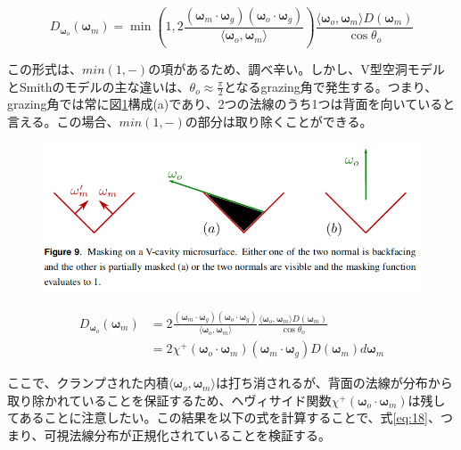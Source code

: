 \documentclass[a4j,xelatex,ja=standard]{bxjsarticle}
\begin{document}
\begin{equation}
    D_{\boldsymbol{\omega}_o}(\boldsymbol{\omega}_m) = \min \left( 1, 2 \frac{(\boldsymbol{\omega}_m \cdot \boldsymbol{\omega}_g) (\boldsymbol{\omega}_o \cdot \boldsymbol{\omega}_g)}{\langle \boldsymbol{\omega}_o, \boldsymbol{\omega}_m \rangle} \right) \frac{\langle \boldsymbol{\omega}_o, \boldsymbol{\omega}_m \rangle D(\boldsymbol{\omega}_m)}{\cos\theta_o}
    \label{eq:50}
\end{equation}

この形式は、$min(1, -)$の項があるため、調べ辛い。しかし、V型空洞モデルとSmithのモデルの主な違いは、$\theta_o \approx \frac{\pi}{2}$となるgrazing角で発生する。つまり、grazing角では常に図\ref{fig:9}構成(a)であり、2つの法線のうち1つは背面を向いていると言える。この場合、$min(1, -)$の部分は取り除くことができる。

\begin{figure}
    \includegraphics[width=\textwidth]{Figure9.png}
    \caption{}
    \label{fig:9}
\end{figure}

\begin{equation}
    \begin{split}
        D_{\boldsymbol{\omega}_o}(\boldsymbol{\omega}_m)
        &= 2 \frac{(\boldsymbol{\omega}_m \cdot \boldsymbol{\omega}_g) (\boldsymbol{\omega}_o \cdot \boldsymbol{\omega}_g)}{\langle \boldsymbol{\omega}_o, \boldsymbol{\omega}_m \rangle} \frac{\langle \boldsymbol{\omega}_o, \boldsymbol{\omega}_m \rangle D(\boldsymbol{\omega}_m)}{\cos\theta_o} \\
        &= 2 \chi^+(\boldsymbol{\omega}_o \cdot \boldsymbol{\omega}_m) (\boldsymbol{\omega}_m \cdot \boldsymbol{\omega}_g) D(\boldsymbol{\omega}_m) d\boldsymbol{\omega}_m
    \end{split}
    \label{eq:51}
\end{equation}

ここで、クランプされた内積$\langle \boldsymbol{\omega}_o, \boldsymbol{\omega}_m \rangle$は打ち消されるが、背面の法線が分布から取り除かれていることを保証するため、ヘヴィサイド関数$\chi^+(\boldsymbol{\omega}_o \cdot \boldsymbol{\omega}_m)$は残してあることに注意したい。この結果を以下の式を計算することで、式\eqref{eq:18}、つまり、可視法線分布が正規化されていることを検証する。
\end{document}
